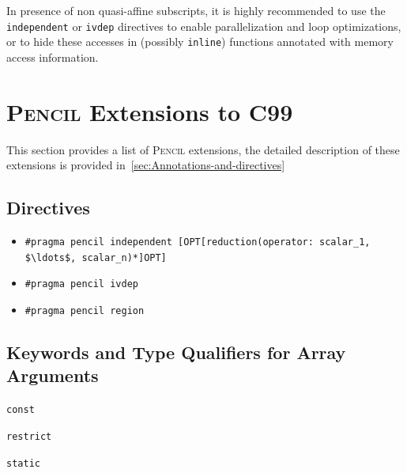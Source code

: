 \documentclass{carp}
\newcommand\pencil{\textsc{Pencil}\xspace}
\begin{document}
In presence of non quasi-affine subscripts, it is highly recommended
to use the \lstinline!independent! or \lstinline!ivdep! directives to
enable parallelization and loop optimizations, or to hide these
accesses in (possibly \lstinline!inline!) functions annotated with
memory access information.

\section{\pencil Extensions to C99}
\label{pencil-extension-short}

This section provides a list of \pencil extensions, the detailed
description of these extensions is provided
in~\ref{sec:Annotations-and-directives}

\subsection*{Directives}
\label{sec:for-directives}

\begin{itemize}
\item \lstinline!#pragma pencil independent [OPT[reduction(operator: scalar_1, $\ldots$, scalar_n)*]OPT]!
\item \lstinline!#pragma pencil ivdep!
\item \lstinline!#pragma pencil region!
\end{itemize}

\subsection*{Keywords and Type Qualifiers for Array Arguments}

\begin{description}
  \item \lstinline!const!
  \item \lstinline!restrict!
  \item \lstinline!static!
\end{description}

%
\end{document}
